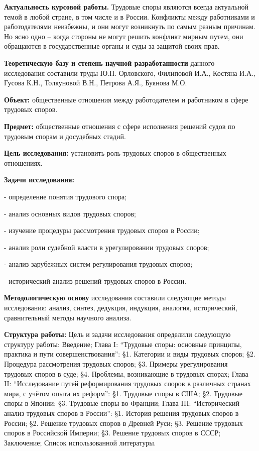 \intro

\textbf{Актуальность курсовой работы.} Трудовые споры являются всегда актуальной темой в любой стране, в том числе и в России. Конфликты между работниками и работодателями неизбежны, и они могут возникнуть по самым разным причинам. Но ясно одно – когда стороны не могут решить конфликт мирным путем, они обращаются в государственные органы и суды за защитой своих прав.

\textbf{Теоретическую базу и степень научной разработанности} данного исследования составили труды Ю.П. Орловского, Филиповой И.А.,  Костяна И.А., Гусова К.Н., Толкуновой В.Н., Петрова А.Я., Буянова М.О. 

\textbf{Объект:} общественные отношения между работодателем и работником в сфере трудовых споров.

\textbf{Предмет:} общественные отношения с сфере исполнения решений судов по трудовым спорам и досудебных стадий. 

\textbf{Цель исследования: } установить роль трудовых споров в общественных отношениях.

\textbf{Задачи исследования: }

- определение понятия трудового спора;

- анализ основных видов трудовых споров;

- изучение процедуры рассмотрения трудовых споров в России;

- анализ роли судебной власти в урегулировании трудовых споров;

- анализ зарубежных систем регулирования трудовых споров;

- исторический анализ решений трудовых споров в России.

\textbf{Методологическую основу} исследования составили следующие методы исследования: анализ, синтез, дедукция, индукция, аналогия, исторический, сравнительный методы научного анализа.

\textbf{Структура работы: } Цель и задачи исследования определили следующую структуру работы: Введение; Глава I: \enquote{Трудовые споры: основные принципы, практика и пути совершенствования}: \S1. Категории и виды трудовых споров; \S2. Процедура рассмотрения трудовых споров; \S3. Примеры урегулирования трудовых споров в суде; \S4. Проблемы, возникающие в трудовых спорах; Глава II: \enquote{Исследование путей реформирования трудовых споров в различных странах мира, с учётом опыта их реформ}: \S1. Трудовые споры в США; \S2. Трудовые споры в Японии; \S3. Трудовые споры во Франции; Глава III:  \enquote{Исторический анализ трудовых споров в России}: \S1. История решения трудовых споров в России; \S2. Решение трудовых споров в Древней Руси; \S3. Решение трудовых споров в Российской Империи; \S3. Решение трудовых споров в СССР; Заключение; Список использованной литературы.

